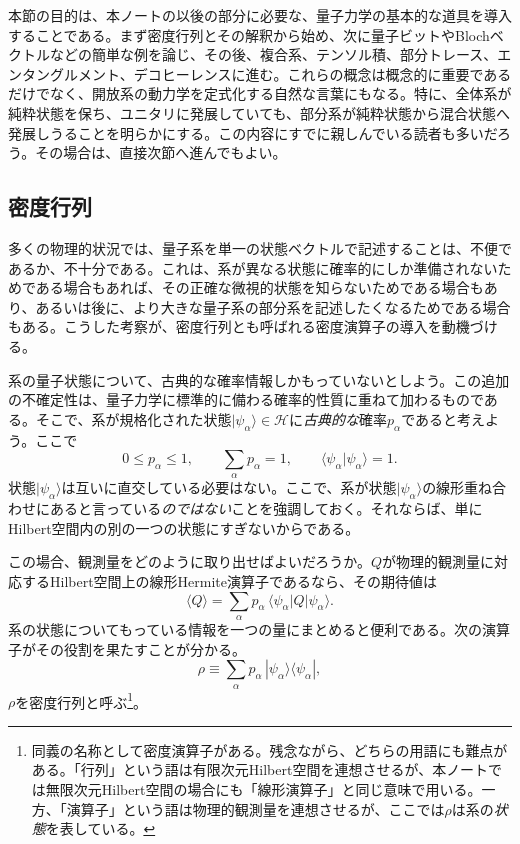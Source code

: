 \documentclass[a4paper,11pt,oneside]{article}
\theoremstyle{definition}
\numberwithin{equation}{section}
\begin{document}
本節の目的は、本ノートの以後の部分に必要な、量子力学の基本的な道具を導入することである。まず密度行列とその解釈から始め、次に量子ビットやBlochベクトルなどの簡単な例を論じ、その後、複合系、テンソル積、部分トレース、エンタングルメント、デコヒーレンスに進む。これらの概念は概念的に重要であるだけでなく、開放系の動力学を定式化する自然な言葉にもなる。特に、全体系が純粋状態を保ち、ユニタリに発展していても、部分系が純粋状態から混合状態へ発展しうることを明らかにする。この内容にすでに親しんでいる読者も多いだろう。その場合は、直接次節へ進んでもよい。


  
 

\subsection{密度行列}



多くの物理的状況では、量子系を単一の状態ベクトルで記述することは、不便であるか、不十分である。これは、系が異なる状態に確率的にしか準備されないためである場合もあれば、その正確な微視的状態を知らないためである場合もあり、あるいは後に、より大きな量子系の部分系を記述したくなるためである場合もある。こうした考察が、密度行列とも呼ばれる密度演算子の導入を動機づける。



系の量子状態について、古典的な確率情報しかもっていないとしよう。この追加の不確定性は、量子力学に標準的に備わる確率的性質に重ねて加わるものである。そこで、系が規格化された状態$|\psi_\alpha\rangle \in \mathcal H$に\textit{古典的な}確率$p_\alpha$であると考えよう。ここで
\begin{equation}
0 \le p_\alpha \le 1,
\qquad
\sum_\alpha p_\alpha = 1,
\qquad
\langle \psi_\alpha | \psi_\alpha \rangle = 1 .
\end{equation}
状態$|\psi_\alpha\rangle$は互いに直交している必要はない。ここで、系が状態$ |\psi_\alpha\rangle $の線形重ね合わせにあると言っている\textit{のではない}ことを強調しておく。それならば、単にHilbert空間内の別の一つの状態にすぎないからである。



この場合、観測量をどのように取り出せばよいだろうか。$Q$が物理的観測量に対応するHilbert空間上の線形Hermite演算子であるなら、その期待値は
\begin{equation}
\langle Q \rangle
=
\sum_\alpha p_\alpha \, \langle \psi_\alpha | Q | \psi_\alpha \rangle .
\end{equation}
系の状態についてもっている情報を一つの量にまとめると便利である。次の演算子がその役割を果たすことが分かる。
\begin{equation}
\rho \equiv \sum_\alpha p_\alpha \, |\psi_\alpha\rangle \langle \psi_\alpha | ,
\end{equation}
$ \rho$を密度行列と呼ぶ\footnote{同義の名称として密度演算子がある。残念ながら、どちらの用語にも難点がある。「行列」という語は有限次元Hilbert空間を連想させるが、本ノートでは無限次元Hilbert空間の場合にも「線形演算子」と同じ意味で用いる。一方、「演算子」という語は物理的観測量を連想させるが、ここでは$ \rho$は系の\textit{状態}を表している。}。
\end{document}
